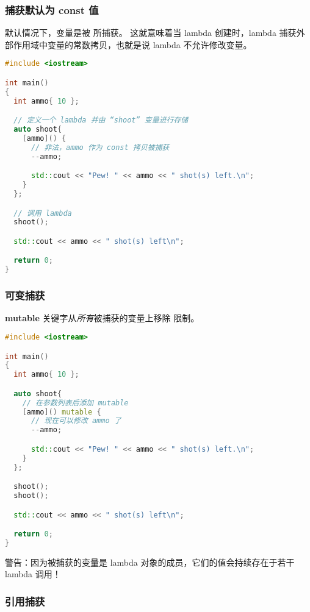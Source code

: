 \documentclass[../../LearnCpp.tex]{subfiles}
\begin{document}
\subsubsection*{捕获默认为 const 值}

默认情况下，变量是被  所捕获。
这就意味着当 lambda 创建时，lambda 捕获外部作用域中变量的常数拷贝，也就是说 lambda 不允许修改变量。

\begin{lstlisting}[language=C++]
#include <iostream>

int main()
{
  int ammo{ 10 };

  // 定义一个 lambda 并由 “shoot” 变量进行存储
  auto shoot{
    [ammo]() {
      // 非法，ammo 作为 const 拷贝被捕获
      --ammo;

      std::cout << "Pew! " << ammo << " shot(s) left.\n";
    }
  };

  // 调用 lambda
  shoot();

  std::cout << ammo << " shot(s) left\n";

  return 0;
}
\end{lstlisting}

\subsubsection*{可变捕获}

\textbf{mutable} 关键字从\textit{所有}被捕获的变量上移除  限制。

\begin{lstlisting}[language=C++]
#include <iostream>

int main()
{
  int ammo{ 10 };

  auto shoot{
    // 在参数列表后添加 mutable
    [ammo]() mutable {
      // 现在可以修改 ammo 了
      --ammo;

      std::cout << "Pew! " << ammo << " shot(s) left.\n";
    }
  };

  shoot();
  shoot();

  std::cout << ammo << " shot(s) left\n";

  return 0;
}
\end{lstlisting}

警告：因为被捕获的变量是 lambda 对象的成员，它们的值会持续存在于若干 lambda 调用！

\subsubsection*{引用捕获}
\end{document}
